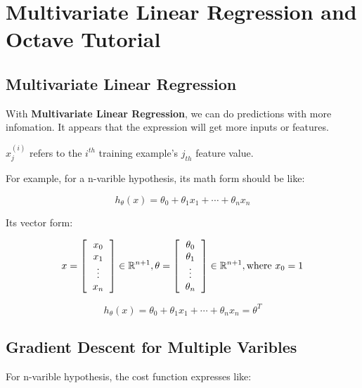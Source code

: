 \documentclass[en,11pt,english,black,simple]{../elegantbook}
\begin{document}
\fi 
\def\chapname{02multvar}

\chapter{Multivariate Linear Regression and Octave Tutorial}

\section{Multivariate Linear Regression}

With \textbf{Multivariate Linear Regression}, we can do predictions with more infomation. It appears that the expression will get more inputs or features.


\begin{note}
    \(x_j^{(i)}\) refers to the \(i^{th}\) training example's \(j_{th}\) feature value.
\end{note}

For example, for a n-varible hypothesis, its math form should be like:

\[
h_\theta(x) = \theta_0 + \theta_1 x_1 + \cdots + \theta_n x_n    
\]

Its vector form: 

\[
    x = \left[\begin{tabular}{c}
        \(x_0\)\\
        \(x_1\)\\
        \(\vdots\)\\
        \(x_n\)
    \end{tabular}\right] \in \mathbb{R}^{n+1}, 
        \theta = \left[\begin{tabular}{c}
            \(\theta_0\)\\
            \(\theta_1\)\\
            \(\vdots\)\\
            \(\theta_n\)
        \end{tabular}\right] \in \mathbb{R}^{n+1},
        \text{where } x_0 = 1 
\]

\[h_\theta(x) = \theta_0 + \theta_1 x_1 + \cdots + \theta_n x_n     = \theta^T\]



\section{Gradient Descent for Multiple Varibles}

For n-varible hypothesis, the cost function expresses like:
\end{document}
